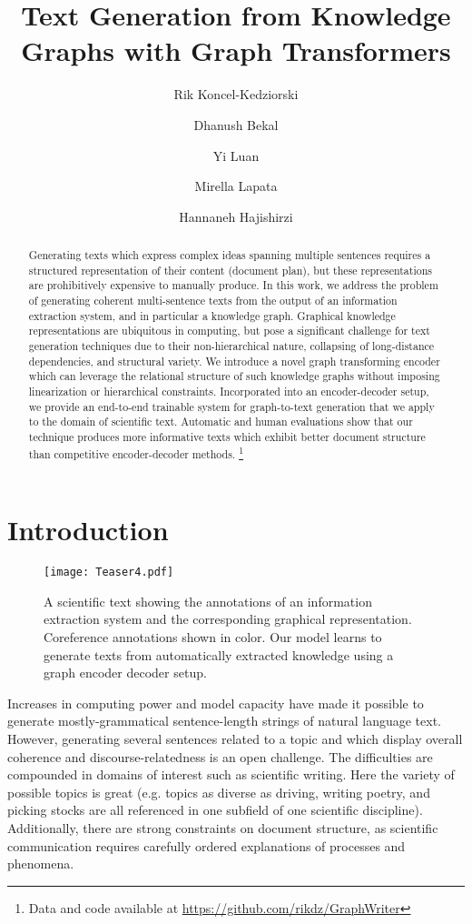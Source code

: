 \documentclass[11pt,a4paper]{article}
\title{Text Generation from Knowledge Graphs with Graph Transformers}
\author[1]{Rik Koncel-Kedziorski}
\author[1]{Dhanush Bekal}
\author[1]{Yi Luan}
\author[2]{Mirella Lapata}
\author[1,3]{Hannaneh Hajishirzi}
\affil[1]{University of Washington}
\affil[ ]{\texttt{\{kedzior,dhanush,luanyi,hannaneh\}@uw.edu}}
\affil[2]{University of Edinburgh}
\affil[ ]{\texttt{mlap@inf.ed.ac.uk}}
\affil[3]{Allen Institute for Artificial Intelligence}
\date{}
\begin{document}
\maketitle
\begin{abstract}

Generating texts which express complex ideas spanning multiple sentences requires a structured representation of their content (document plan), but these representations are prohibitively expensive to manually produce. 
In this work, we address the problem of generating coherent multi-sentence texts from the output of an information extraction system, and in particular a knowledge graph. 
Graphical knowledge representations are ubiquitous in computing, but pose a significant challenge for text generation techniques due to their non-hierarchical nature, collapsing of long-distance dependencies, and structural variety. 
We introduce a novel graph transforming encoder which can leverage the relational structure of such knowledge graphs without imposing linearization or hierarchical constraints.
Incorporated into an encoder-decoder setup, we provide an end-to-end trainable system for graph-to-text generation that we apply to the domain of scientific text. 
Automatic and human evaluations show that our technique produces more informative texts which exhibit better document structure than competitive encoder-decoder methods. 
\footnote{Data and code available at \url{https://github.com/rikdz/GraphWriter}}
\end{abstract}


\section{Introduction}

\begin{figure}
    \centering
    \texttt{[image: Teaser4.pdf]}
    \caption{A scientific text showing the annotations of an information extraction system and the corresponding graphical representation. Coreference annotations shown in color. Our model learns to generate texts from automatically extracted knowledge using a graph encoder decoder setup.}
    \label{fig:teaser}
\end{figure}
Increases in computing power and model capacity have made it possible to generate mostly-grammatical sentence-length strings of natural language text.
However, generating several sentences related to a topic and which display overall coherence and discourse-relatedness is an open challenge.
The difficulties are compounded in domains of interest such as scientific writing. 
Here the variety of possible topics is great (e.g. topics as diverse as driving, writing poetry, and picking stocks are all referenced in one subfield of one scientific discipline). 
Additionally, there are strong constraints on document structure, as scientific communication requires carefully ordered explanations of processes and phenomena. 
\end{document}
